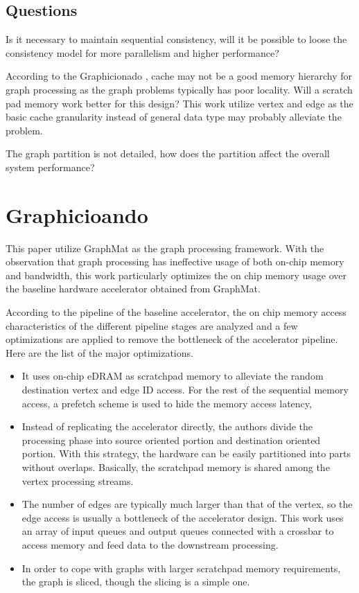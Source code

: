 \subsection{Questions}
Is it necessary to maintain sequential consistency, will it be possible to loose the consistency model for more parallelism and higher performance?

According to the Graphicionado \cite{hamgra2016phicionado}, cache may not be a good memory hierarchy for graph processing as the graph problems typically has poor locality. Will a scratch pad memory work better for this design? This work utilize vertex and edge as the basic cache granularity instead of general data type may probably alleviate the problem.

The graph partition is not detailed, how does the partition affect the overall system performance? 


\section{Graphicioando}
This paper utilize GraphMat \cite{sundaram2015graphmat} as the graph processing framework. With the observation that graph processing has ineffective usage of both on-chip memory and bandwidth, this work particularly optimizes the on chip memory usage over the baseline hardware accelerator obtained from GraphMat. 

According to the pipeline of the baseline accelerator, the on chip memory access characteristics of the different pipeline stages are analyzed and a few optimizations are applied to remove the bottleneck of the accelerator pipeline. Here are the list of the major optimizations.
\begin{itemize}
    \item It uses on-chip eDRAM as scratchpad memory to alleviate the random destination vertex and edge ID access. For the rest of the sequential memory access, a prefetch scheme is used to hide the memory access latency,
    \item Instead of replicating the accelerator directly, the authors divide the processing phase into source oriented portion and destination oriented portion. With this strategy, the hardware can be easily partitioned into parts without overlaps. Basically, the scratchpad memory is shared among the vertex processing streams. 
    \item The number of edges are typically much larger than that of the vertex, so the edge access is usually a bottleneck of the accelerator design. This work uses an array of input queues and output queues connected with a crossbar to access memory and feed data to the downstream processing. 
    \item In order to cope with graphs with larger scratchpad memory requirements, the graph is sliced, though the slicing is a simple one.
\end{itemize}


